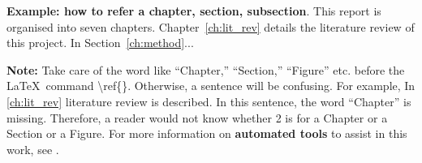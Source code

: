 \textbf{Example: how to refer a chapter, section, subsection}. This
report is organised into seven chapters. Chapter~\ref{ch:lit_rev}
details the literature review of this project. In
Section~\ref{ch:method}...  %

\textbf{Note:}  Take care of the word like ``Chapter,'' ``Section,''
``Figure'' etc. before the \LaTeX~command \textbackslash ref\{\}.
Otherwise, a  sentence will be confusing. For example, In
\ref{ch:lit_rev} literature review is described. In this sentence,
the word ``Chapter'' is missing. Therefore, a reader would not know
whether 2 is for a Chapter or a Section or a Figure.  For more
information on \textbf{automated tools} to assist in this work, see
.
